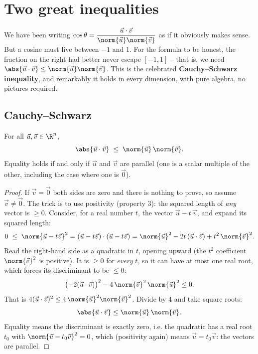 \section{Two great inequalities}

We have been writing
$\cos\theta = \dfrac{\vec u\cdot\vec v}{\norm{\vec u}\norm{\vec v}}$ as if it
obviously makes sense. But a cosine must live between $-1$ and $1$. For the formula
to be honest, the fraction on the right had better never escape $[-1,1]$ -- that is,
we need $\abs{\vec u\cdot\vec v} \le \norm{\vec u}\norm{\vec v}$. This is the
celebrated \textbf{Cauchy--Schwarz inequality}, and remarkably it holds in every
dimension, with pure algebra, no pictures required.

\subsection{Cauchy--Schwarz}

\begin{theorem}\label{ch04:cs}
For all $\vec u,\vec v\in\R^n$,
\[
  \abs{\vec u\cdot\vec v} \;\le\; \norm{\vec u}\,\norm{\vec v}.
\]
Equality holds if and only if $\vec u$ and $\vec v$ are parallel (one is a scalar
multiple of the other, including the case where one is $\vec 0$).
\end{theorem}

\begin{proof}
If $\vec v = \vec 0$ both sides are zero and there is nothing to prove, so assume
$\vec v\ne\vec 0$. The trick is to use positivity (property 3): the squared length of
\emph{any} vector is $\ge 0$. Consider, for a real number $t$, the vector
$\vec u - t\,\vec v$, and expand its squared length:
\[
  0 \;\le\; \norm{\vec u - t\vec v}^2
    = (\vec u - t\vec v)\cdot(\vec u - t\vec v)
    = \norm{\vec u}^2 - 2t\,(\vec u\cdot\vec v) + t^2\,\norm{\vec v}^2.
\]
Read the right-hand side as a quadratic in $t$, opening upward (the $t^2$ coefficient
$\norm{\vec v}^2$ is positive). It is $\ge 0$ for \emph{every} $t$, so it can have at
most one real root, which forces its discriminant to be $\le 0$:
\[
  \bigl(-2(\vec u\cdot\vec v)\bigr)^2 - 4\,\norm{\vec v}^2\,\norm{\vec u}^2 \le 0.
\]
That is $4(\vec u\cdot\vec v)^2 \le 4\,\norm{\vec u}^2\norm{\vec v}^2$. Divide by $4$
and take square roots:
\[
  \abs{\vec u\cdot\vec v} \le \norm{\vec u}\,\norm{\vec v}.
\]
Equality means the discriminant is exactly zero, i.e. the quadratic has a real root
$t_0$ with $\norm{\vec u - t_0\vec v}^2 = 0$, which (positivity again) means
$\vec u = t_0\vec v$: the vectors are parallel.
\end{proof}

